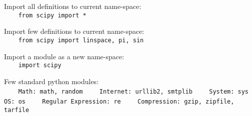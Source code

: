 Import all definitions to current name-space:\\
{\ex \lstinline|    from scipy import *|}

Import few definitions to current name-space:\\
{\ex \lstinline|    from scipy import linspace, pi, sin|}

Import a module as a new name-space:\\
{\ex \lstinline|    import scipy|}

Few standard python modules:\\
{\ex \lstinline|    Math: math, random|}
{\ex \lstinline|    Internet: urllib2, smtplib|}
{\ex \lstinline|    System: sys|}
{\ex \lstinline|    OS: os|}
{\ex \lstinline|    Regular Expression: re|}
{\ex \lstinline|    Compression: gzip, zipfile, tarfile|}
